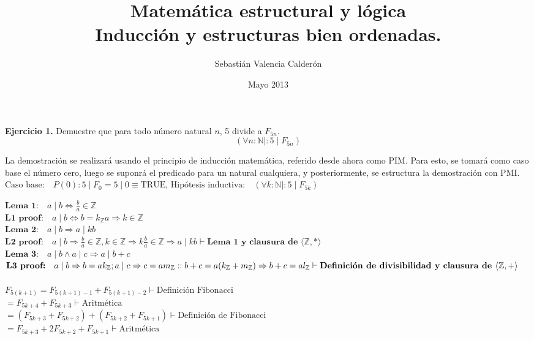 \documentclass{article}
\begin{document}
\title{Matem\'atica estructural y l\'ogica \\ Inducci\'on y estructuras bien
ordenadas.}
\author{Sebasti\'an Valencia Calder\'on}
\date{Mayo 2013}
\maketitle

\textbf{Ejercicio 1.} Demuestre que para todo n\'umero natural $n$, 5 divide a
$F_{5n}$.
$$ ( \forall n: \mathbb{N} \mid : 5 \mid F_{5n} ) $$
{\raggedright
La demostraci\'on se realizar\'a usando el principio de inducci\'on 
matem\'atica, referido desde ahora como PIM. Para esto, se tomar\'a como
caso base el n\'umero cero, luego se suponr\'a el predicado para un natural
cualquiera, y posteriormente, se estructura la demostraci\'on con PMI.
$\text{Caso base:} \quad P(0) :  5 \mid F_{0} = 5 \mid 0 \equiv \text{TRUE}$, 
$\text{Hip\'otesis inductiva:} \quad ( \forall k: \mathbb{N} \mid : 5 \mid
F_{5k} )$
}
$\textbf{Lema 1:} \quad a \mid b \iff \frac{b}{a} \in \mathbb{Z}$ \\
$\textbf{L1 proof:} \quad a \mid b \iff b = k_{\mathbb{Z}}a \Rightarrow k \in
\mathbb{Z}$
\\
$\textbf{Lema 2:} \quad a \mid b \Rightarrow a \mid kb$ \\
$\textbf{L2 proof:} \quad a \mid b \Rightarrow \frac{b}{a} \in \mathbb{Z}, k \in
\mathbb{Z} \Rightarrow k\frac{b}{a} \in \mathbb{Z} \Rightarrow a \mid kb \vdash
\textbf{Lema 1 y clausura de $\langle \mathbb{Z},* \rangle$ } $
\\
$\textbf{Lema 3:} \quad a \mid b \wedge a \mid c \Rightarrow a \mid b+c$ \\
$\textbf{L3 proof:} \quad a \mid b \Rightarrow b = ak_{\mathbb{Z}};a \mid c
\Rightarrow c = am_{\mathbb{Z}}::b+c=a(k_{\mathbb{Z}}+m_{\mathbb{Z}})
\Rightarrow b+c = al_{\mathbb{Z}} \\ \vdash
\textbf{Definici\'on de divisibilidad y clausura de $\langle \mathbb{Z},+
\rangle$ } $
\\
\\
$ F_{5(k+1)} = F_{5(k+1)-1} + F_{5(k+1)-2} \vdash \text{Definici\'on
                Fibonacci} $\\
$  = F_{5k+4} + F_{5k+3} \vdash \text{Aritm\'etica} $ \\
$  = (F_{5k+3} + F_{5k+2}) + (F_{5k+2} + F_{5k+1})\vdash
    \text{Definici\'on de Fibonacci} $ \\
$  = F_{5k+3} + 2F_{5k+2} + F_{5k+1} \vdash \text{Aritm\'etica}  $\\
\end{document}
